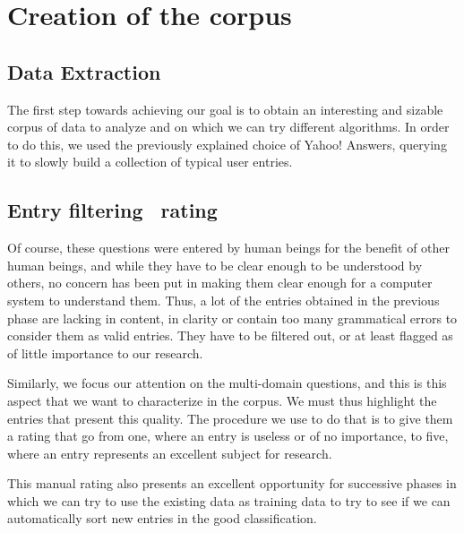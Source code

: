 
\section{Creation of the corpus} %
\label{sec:creation_of_the_corpus}

\subsection{Data Extraction} %
\label{sub:data_extraction}

The first step towards achieving our goal is to obtain an interesting and sizable corpus of data to analyze and on which we can try different algorithms. In order to do this, we used the previously explained choice of Yahoo! Answers, querying it to slowly build a collection of typical user entries.


\subsection{Entry filtering \amper\ rating} %
\label{sub:entry_filtering_rating}

Of course, these questions were entered by human beings for the benefit of other human beings, and while they have to be clear enough to be understood by others, no concern has been put in making them clear enough for a computer system to understand them. Thus, a lot of the entries obtained in the previous phase are lacking in content, in clarity or contain too many grammatical errors to consider them as valid entries. They have to be filtered out, or at least flagged as of little importance to our research.

Similarly, we focus our attention on the multi-domain questions, and this is this aspect that we want to characterize in the corpus. We must thus highlight the entries that present this quality. The procedure we use to do that is to give them a rating that go from one, where an entry is useless or of no importance, to five, where an entry represents an excellent subject for research.

This manual rating also presents an excellent opportunity for successive phases in which we can try to use the existing data as training data to try to see if we can automatically sort new entries in the good classification.


